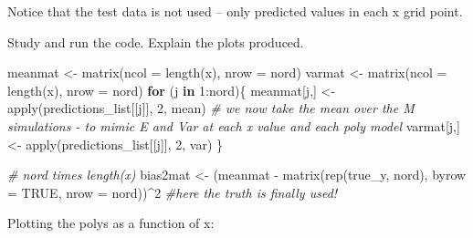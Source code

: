 \documentclass[
]{article}
\newenvironment{Shaded}{\begin{snugshade}}{\end{snugshade}}
\newcommand{\AttributeTok}[1]{\textcolor[rgb]{0.77,0.63,0.00}{#1}}
\newcommand{\CommentTok}[1]{\textcolor[rgb]{0.56,0.35,0.01}{\textit{#1}}}
\newcommand{\ConstantTok}[1]{\textcolor[rgb]{0.00,0.00,0.00}{#1}}
\newcommand{\ControlFlowTok}[1]{\textcolor[rgb]{0.13,0.29,0.53}{\textbf{#1}}}
\newcommand{\DecValTok}[1]{\textcolor[rgb]{0.00,0.00,0.81}{#1}}
\newcommand{\FunctionTok}[1]{\textcolor[rgb]{0.00,0.00,0.00}{#1}}
\newcommand{\NormalTok}[1]{#1}
\newcommand{\OtherTok}[1]{\textcolor[rgb]{0.56,0.35,0.01}{#1}}
\newcommand{\SpecialCharTok}[1]{\textcolor[rgb]{0.00,0.00,0.00}{#1}}
\begin{document}
Notice that the test data is not used -- only predicted values in each x
grid point.

Study and run the code. Explain the plots produced.

\begin{Shaded}
\begin{Highlighting}[]
\NormalTok{meanmat }\OtherTok{\textless{}{-}} \FunctionTok{matrix}\NormalTok{(}\AttributeTok{ncol =} \FunctionTok{length}\NormalTok{(x), }\AttributeTok{nrow =}\NormalTok{ nord)}
\NormalTok{varmat }\OtherTok{\textless{}{-}} \FunctionTok{matrix}\NormalTok{(}\AttributeTok{ncol =} \FunctionTok{length}\NormalTok{(x), }\AttributeTok{nrow =}\NormalTok{ nord)}
\ControlFlowTok{for}\NormalTok{ (j }\ControlFlowTok{in} \DecValTok{1}\SpecialCharTok{:}\NormalTok{nord)\{}
\NormalTok{  meanmat[j,] }\OtherTok{\textless{}{-}} \FunctionTok{apply}\NormalTok{(predictions\_list[[j]], }\DecValTok{2}\NormalTok{, mean) }\CommentTok{\# we now take the mean over the M simulations {-} to mimic E and Var at each x value and each poly model}
\NormalTok{  varmat[j,] }\OtherTok{\textless{}{-}} \FunctionTok{apply}\NormalTok{(predictions\_list[[j]], }\DecValTok{2}\NormalTok{, var)}
\NormalTok{\}}

\CommentTok{\# nord times length(x)}
\NormalTok{bias2mat }\OtherTok{\textless{}{-}}\NormalTok{ (meanmat }\SpecialCharTok{{-}} \FunctionTok{matrix}\NormalTok{(}\FunctionTok{rep}\NormalTok{(true\_y, nord), }\AttributeTok{byrow =} \ConstantTok{TRUE}\NormalTok{, }\AttributeTok{nrow =}\NormalTok{ nord))}\SpecialCharTok{\^{}}\DecValTok{2} \CommentTok{\#here the truth is finally used!}
\end{Highlighting}
\end{Shaded}

Plotting the polys as a function of x:
\end{document}
